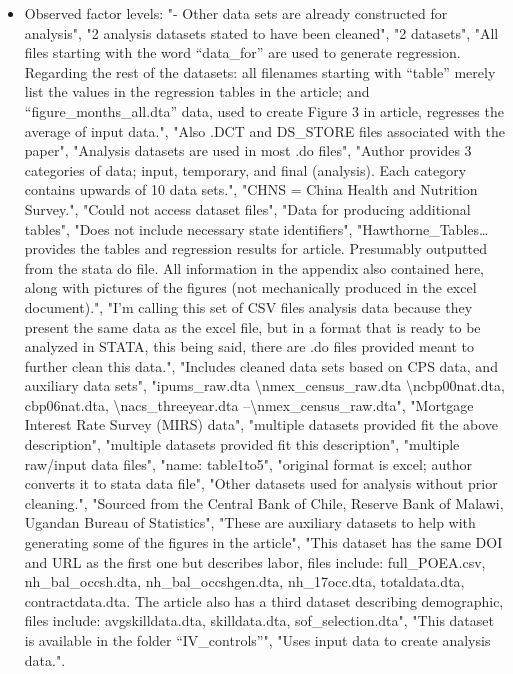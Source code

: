 \documentclass[]{article}
\providecommand{\tightlist}{%
  \setlength{\itemsep}{0pt}\setlength{\parskip}{0pt}}
\begin{document}
\begin{itemize}
\tightlist
\item
  Observed factor levels: "- Other data sets are already constructed for
  analysis", "2 analysis datasets stated to have been cleaned", "2
  datasets", "All files starting with the word ``data\_for'' are used to
  generate regression. Regarding the rest of the datasets: all filenames
  starting with ``table'' merely list the values in the regression
  tables in the article; and ``figure\_months\_all.dta'' data, used to
  create Figure 3 in article, regresses the average of input data.",
  "Also .DCT and DS\_STORE files associated with the paper", "Analysis
  datasets are used in most .do files", "Author provides 3 categories of
  data; input, temporary, and final (analysis). Each category contains
  upwards of 10 data sets.", "CHNS = China Health and Nutrition
  Survey.", "Could not access dataset files", "Data for producing
  additional tables", "Does not include necessary state identifiers",
  "Hawthorne\_Tables\ldots{} provides the tables and regression results
  for article. Presumably outputted from the stata do file. All
  information in the appendix also contained here, along with pictures
  of the figures (not mechanically produced in the excel document).",
  "I'm calling this set of CSV files analysis data because they present
  the same data as the excel file, but in a format that is ready to be
  analyzed in STATA, this being said, there are .do files provided meant
  to further clean this data.", "Includes cleaned data sets based on CPS
  data, and auxiliary data sets", "ipums\_raw.dta
  \textbackslash{}nmex\_census\_raw.dta \textbackslash{}ncbp00nat.dta,
  cbp06nat.dta, \textbackslash{}nacs\_threeyear.dta
  --\textbackslash{}nmex\_census\_raw.dta", "Mortgage Interest Rate
  Survey (MIRS) data", "multiple datasets provided fit the above
  description", "multiple datasets provided fit this description",
  "multiple raw/input data files", "name: table1to5", "original format
  is excel; author converts it to stata data file", "Other datasets used
  for analysis without prior cleaning.", "Sourced from the Central Bank
  of Chile, Reserve Bank of Malawi, Ugandan Bureau of Statistics",
  "These are auxiliary datasets to help with generating some of the
  figures in the article", "This dataset has the same DOI and URL as the
  first one but describes labor, files include: full\_POEA.csv,
  nh\_bal\_occsh.dta, nh\_bal\_occshgen.dta, nh\_17occ.dta,
  totaldata.dta, contractdata.dta. The article also has a third dataset
  describing demographic, files include: avgskilldata.dta,
  skilldata.dta, sof\_selection.dta", "This dataset is available in the
  folder ``IV\_controls''", "Uses input data to create analysis data.".
\end{itemize}
\end{document}
